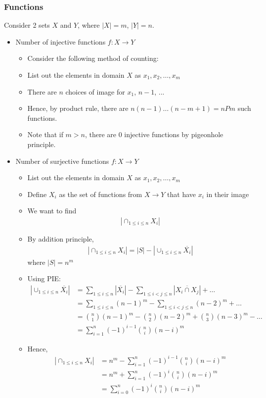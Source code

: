 \documentclass{article}
\begin{document}
\subsubsection{Functions}
Consider 2 sets $X$ and $Y$, where $|X|=m$, $|Y|=n$. 
\begin{itemize}
	\item Number of injective functions $f: X\rightarrow Y$
	\begin{itemize}
		\item Consider the following method of counting:
		\item List out the elements in domain $X$ as $x_1,x_2,\dots,x_m$
		\item There are $n$ choices of image for $x_1$, $n-1$, ...
		\item Hence, by product rule, there are $n(n-1)\dots(n-m+1)=nPm$ such functions.
		\item Note that if $m>n$, there are $0$ injective functions by pigeonhole principle.
	\end{itemize}
	\item Number of surjective functions $f: X\rightarrow Y$
	\begin{itemize}
		\item List out the elements in domain $X$ as $x_1,x_2,\dots,x_m$
		\item Define $X_i$ as the set of functions from $X\rightarrow Y$ that have $x_i$ in their image
		\item We want to find \begin{align*}
			|\cap_{1\leq i\leq n}X_i|
		\end{align*}
		\item By addition principle, \begin{align*}
			|\cap_{1\leq i\leq n}X_i| = |S| - |\cup_{1\leq i\leq n}\overline{X_i}|
		\end{align*}
		where $|S|=n^m$
		\item Using PIE: \begin{align*}
			|\cup_{1\leq i\leq n}\overline{X_i}|&=\sum_{1\leq i\leq n} |\overline{X_i}| - \sum_{1\leq i < j\leq n} |\overline{X_i \cap X_j}|+\dots\\
			&=\sum_{1\leq i\leq n}(n-1)^m-\sum_{1\leq i < j\leq n}(n-2)^m+\dots\\
			&=\binom{n}{1}(n-1)^m-\binom{n}{2}(n-2)^m+\binom{n}{3}(n-3)^m-\dots\\
			&=\sum_{i=1}^{n}(-1)^{i-1}\binom{n}{i}(n-i)^m
		\end{align*}
		\item Hence, \begin{align*}
			|\cap_{1\leq i\leq n}X_i|&=n^m-\sum_{i=1}^{n}(-1)^{i-1}\binom{n}{i}(n-i)^m\\
			&=n^m+\sum_{i=1}^{n}(-1)^{i}\binom{n}{i}(n-i)^m\\
			&=\sum_{i=0}^{n}(-1)^{i}\binom{n}{i}(n-i)^m
		\end{align*}
	\end{itemize}
\end{itemize}
\end{document}
